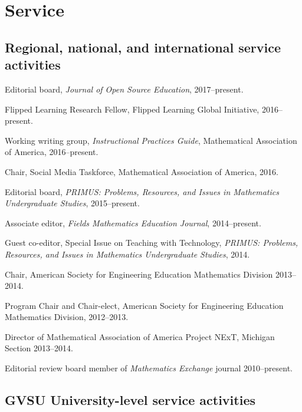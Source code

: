\documentclass[letterpaper]{article}
\renewenvironment{itemize}{
  \begin{list}{}{
    \setlength{\leftmargin}{1.5em}
	\setlength{\itemsep}{0in}
  }
}{
  \end{list}
}
\begin{document}


\section*{Service}

\subsection*{Regional, national, and international service activities}
\begin{itemize}
	\item Editorial board, \emph{Journal of Open Source Education}, 2017--present. 
	\item Flipped Learning Research Fellow, Flipped Learning Global Initiative, 2016--present.
	\item Working writing group, \textit{Instructional Practices Guide}, Mathematical Association of America, 2016--present.
	\item Chair, Social Media Taskforce, Mathematical Association of America, 2016.
	\item Editorial board, \emph{PRIMUS: Problems, Resources, and Issues in Mathematics Undergraduate Studies}, 2015--present.
	\item Associate editor, \emph{Fields Mathematics Education Journal}, 2014--present.
	\item Guest co-editor, Special Issue on Teaching with Technology, \emph{PRIMUS: Problems, Resources, and Issues in Mathematics Undergraduate Studies}, 2014.
	\item Chair, American Society for Engineering Education Mathematics Division 2013--2014.
	\item Program Chair and Chair-elect, American Society for Engineering Education Mathematics Division, 2012--2013.
	\item Director of Mathematical Association of America Project NExT, Michigan Section 2013--2014.
	\item Editorial review board member of \emph{Mathematics Exchange} journal 2010--present.
\end{itemize}

\subsection*{GVSU University-level service activities}
\end{document}
